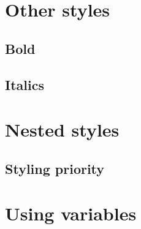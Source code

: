\section{Other styles}

\subsection{Bold}

\subsection{Italics}

\section{Nested styles}
\label{sec:nestedstyles}

\subsection{Styling priority}

\section{Using variables}